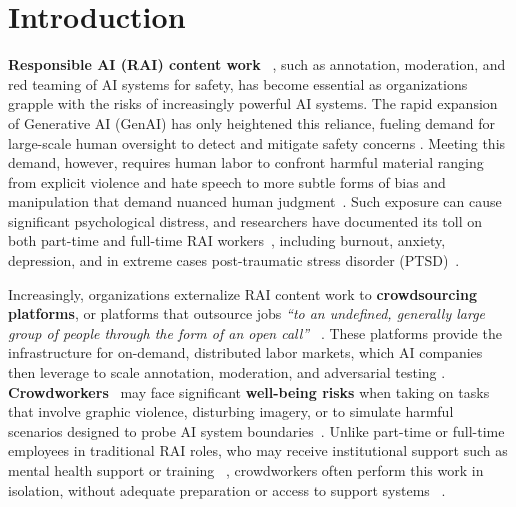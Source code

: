 \section{Introduction}

\textbf{Responsible AI (RAI) content work} ~\cite{qian2025aura}, such as annotation, moderation, and red teaming of AI systems for safety, has become essential as organizations grapple with the risks of increasingly powerful AI systems. The rapid expansion of Generative AI (GenAI) has only heightened this reliance, fueling demand for large-scale human oversight to detect and mitigate safety concerns \cite{StanfordHAI2025AIIndex, GrandViewResearch2024GenerativeAI}. %
Meeting this demand, however, requires human labor to confront harmful material ranging from explicit violence and hate speech to more subtle forms of bias and manipulation that demand nuanced human judgment~\cite{qian2025aura}. Such exposure can cause significant psychological distress, and researchers have documented its toll on both part-time and full-time RAI workers~\cite{roberts2016commercial, qian2025aura}, including burnout, anxiety, depression, and in extreme cases post-traumatic stress disorder (PTSD)~\cite{alemadi2024emotional, martinez2024secondary, spence2025content, gebrekidan2024content}.


Increasingly, organizations externalize RAI content work to \textbf{crowdsourcing platforms}, or platforms that outsource jobs \textit{``to an undefined, generally large group of people through the form of an open call''} ~\cite{howe2006rise, berg2018digital}. These platforms provide the infrastructure for on-demand, distributed labor markets, which AI companies then leverage to scale annotation, moderation, and adversarial testing \cite{udupa2023ethical, mann2025meta, egelman2014crowdsourcing}.
\textbf{Crowdworkers}~\cite{berg2018digital} may face significant \textbf{well-being risks} when taking on tasks that involve graphic violence, disturbing imagery, or to simulate harmful scenarios designed to probe AI system boundaries~\cite{qian2025locating}. 
Unlike part-time or full-time employees in traditional RAI roles, who may receive institutional support such as mental health support or training ~\cite{qian2025aura, roberts2016commercial, steiger_psychological_2021}, crowdworkers often perform this work in isolation, without adequate preparation or access to support systems ~\cite{schlicher2021flexible, berastegui2021exposure}. 


